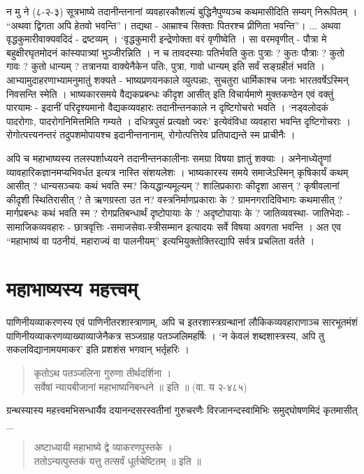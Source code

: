 न मु ने (८-२-३) सूत्रभाष्ये तदानीन्तनानां व्यवहारकौशल्यं बुद्धिनैपुण्यञ्च कथमासीदिति सम्यग् निरूपितम् । “अथवा द्विगता अपि हेतवो भवन्ति”। तद्यथा - आम्राश्च सिक्ताः पितरश्च प्रीणिता भवन्ति”। ... अथवा वृद्धकुमारीवाक्यवदिदं - द्रष्टव्यम् । ‘वृद्धकुमारी इन्द्रेणोक्ता वरं वृणीष्वेति । सा वरमवृणीत् - पौत्रा मे बहुक्षीरघृतमोदनं कांस्यपात्र्यां भुञ्जीरन्निति । न च तावदस्याः पतिर्भवति कुतः पुत्राः ? कुतः पौत्राः ? कुतो गावः ? कुतो धान्यम् ?  तत्रानया वाक्येनैकेन पतिः, पुत्रा, गावो धान्यम् इति सर्वं सङ्ग्रहीतं भवति । आभ्यामुदाहरणाभ्यामनुमातुं शक्यते - भाष्यप्रणयनकाले व्युत्पन्नाः, सुचतुरा धार्मिकाश्च जनाः भारतवर्षेऽस्मिन् निवसन्ति स्मेति । भाष्यकारसमये वैद्यकप्रबन्धः कीदृश आसीत् इति विचार्यमाणे मुक्तकण्ठेन एवं वक्तुं पारयामः - इदानीं परिदृश्यमानो वैद्यकव्यवहारः तदानीन्तनकाले न दृष्टिगोचरो भवति । ‘नड्वलोदकं पादरोगाः, पादरोगनिमित्तमिति गम्यते । दधित्रपुसं प्रत्यक्षो ज्वरः’ इत्येवंविधा व्यवहारा भवन्ति दृष्टिगोचराः । रोगोत्पत्त्यनन्तरं तदुपशमोपायश्च इदानीन्तनानाम्, रोगोत्पत्तिरेव प्रतिपाद्यन्ते स्म प्राचीनैः ।

अपि च महाभाष्यस्य तलस्पर्शाध्ययने तदानीन्तनकालीनाः समग्रा विषया ज्ञातुं शक्याः । अनेनाध्येतॄणां व्यावहारिकज्ञानमप्यभिवर्धत इत्यत्र नास्ति संशयलेशः । भाष्यकारस्य समये समाजेऽस्मिन् कृषिकार्यं कथम् आसीत् ? धान्यसञ्चयः कथं भवति स्म? कियद्धान्यमूल्यम् ? शालिप्रकाराः कीदृशा आसन् ? कृषीवलानां कीदृशी स्थितिरासीत् ? ते ऋणग्रस्ता उत न? वस्त्रनिर्माणप्रकाराः के ? ग्रामनगरादिविभागः कथमासीत् ? मार्गप्रबन्धः कथं भवति स्म ? रोगप्रतिबन्धार्थं दृष्टोपायाः के ? अदृष्टोपायाः के ? जातिव्यवस्था- जातिभेदाः - सामाजिकव्यवहारः - छात्रवृत्तिः -समाजसेवा-स्त्रीसम्मान इत्यादयः सर्वे विषया अवगता भवन्ति । अत एव “महाभाष्यं वा पठनीयं, महाराज्यं वा पालनीयम्” इत्यभियुक्तोक्तिरद्यापि सर्वत्र प्रचलिता वर्तते ।

\section*{महाभाष्यस्य महत्त्वम्}

पाणिनीयव्याकरणस्य एवं पाणिनीतरशास्त्राणाम्, अपि च इतरशास्त्रग्रन्थानां लौकिकव्यवहाराणाञ्च सारभूतमंशं पाणिनीयव्याकरणव्याख्याव्याजेनैकत्र सञ्जग्राह पतञ्जलिमहर्षिः । ‘न केवलं शब्दशास्त्रस्य, अपि तु सकलविद्यानामयमाकर’ इति प्रशशंस भगवान् भर्तृहरिः ।
\begin{verse}
कृतोऽथ पतञ्जलिना गुरुणा तीर्थदर्शिना ।\\
सर्वेषां न्यायबीजानां महाभाष्यनिबन्धने ॥ इति ॥ (वा. य २-४८५)
\end{verse}
ग्रन्थस्यास्य महत्त्वमभिसन्धार्यैव दयानन्दसरस्वतीनां गुरुचरणैः विरजानन्दस्वामिभिः समुद्घोषणमिदं कृतमासीत् _
\begin{verse}
अष्टाध्यायी महाभाष्ये द्वे व्याकरणपुस्तके ।\\
ततोऽन्यत्पुस्तकं यत्तु तत्सर्वं धूर्तचेष्टितम् ॥ इति ॥
\end{verse}

